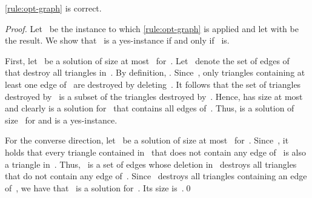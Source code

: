 \documentclass[envcountsame,numbook,smallextended]{svjour3}
\numberwithin{equation}{section}
\numberwithin{figure}{section}
\begin{document}
\begin{lemma}\label{lem:opt-graph-correct}
  \cref{rule:opt-graph} is correct. 
\end{lemma}
\begin{proof}
  Let~ be the instance
  to which \cref{rule:opt-graph} is applied and let  with  be the result. We show that~ is a yes-instance if and only if ~is.

  First, let~ be a solution of size at most~ for~. Let~ denote the set of edges of~ that destroy all triangles in~. By definition, .  Since~, only triangles containing at least one edge of~ are destroyed by deleting~. It follows that the set of triangles destroyed by~ is a subset of the triangles destroyed by~.  Hence,  has size at most~ and clearly is a solution for~ that contains all edges of~. Thus,  is a solution of size~ for  and  is a yes-instance.

  For the converse direction, let~ be a solution of size at most~ for~. Since~, it holds that every triangle contained in~ that does not contain any edge of~ is also a triangle in~.  Thus, ~is a set of edges whose deletion in~ destroys all triangles that do not contain any edge of~. Since~ destroys all triangles containing an edge of~, we have that~ is a solution for~.  Its size is~.\qed
\end{proof}
\end{document}
